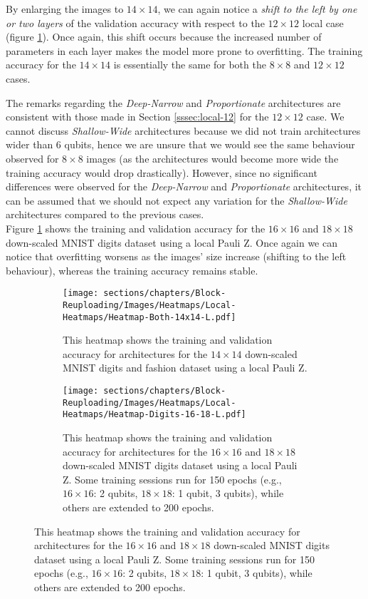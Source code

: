 By enlarging the images to $14\times14$, we can again notice a \textit{shift to the left by 
one or two layers} of the validation accuracy with respect to the $12\times12$ local case (figure 
\ref{fig:heatmap-14x14}). Once again, this shift 
occurs because the increased number of parameters in each layer makes the model more prone to overfitting.
The training accuracy for the $14\times14$ is essentially the same for both the $8\times8$ and 
$12\times12$ cases.

The remarks regarding the \textit{Deep-Narrow} and \textit{Proportionate} architectures are consistent 
with those made in Section \ref{sssec:local-12} for the $12\times12$ case.
We cannot discuss \textit{Shallow-Wide} architectures because we did not train architectures wider
than 6 qubits, hence we are unsure that we would see the same behaviour observed for $8\times8$ 
images (as the architectures would become more wide the training accuracy would drop drastically).
However, since no significant differences were observed for the \textit{Deep-Narrow} 
and \textit{Proportionate} architectures, it can be assumed that we should not expect any variation 
for the \textit{Shallow-Wide} architectures compared to the previous cases.\\

Figure \ref{fig:heatmap-14x14} shows the training and validation accuracy for the $16\times16$ and 
$18\times18$ down-scaled MNIST digits dataset using a local Pauli Z.
Once again we can notice that overfitting worsens as the images' size increase (shifting to the left behaviour), 
whereas the training accuracy remains stable.


\begin{figure}[H]
    \centering
    \begin{subfigure}[b]{\textwidth}
        \centering
        \texttt{[image: sections/chapters/Block-Reuploading/Images/Heatmaps/Local-Heatmaps/Heatmap-Both-14x14-L.pdf]}
        \caption*{This heatmap shows the training and validation accuracy for architectures for the $14\times14$ down-scaled MNIST digits and fashion dataset using a local Pauli Z.}
    \end{subfigure}
    \begin{subfigure}[b]{\textwidth}
        \centering
        \texttt{[image: sections/chapters/Block-Reuploading/Images/Heatmaps/Local-Heatmaps/Heatmap-Digits-16-18-L.pdf]}
        \caption*{This heatmap shows the training and validation accuracy for architectures for the $16\times16$ and 
        $18\times18$ down-scaled MNIST digits dataset using a local Pauli Z.
        Some training sessions run for 150 epochs (e.g., $16\times16$: 2 qubits, $18\times18$: 
        1 qubit, 3 qubits), while others are extended to 200 epochs.}
    \end{subfigure}
    \label{fig:heatmap-14x14}
\end{figure}


